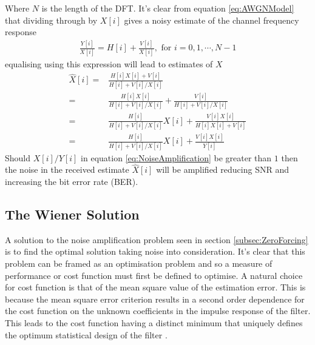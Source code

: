 Where $N$ is the length of the DFT. It's clear from %
equation \ref{eq:AWGNModel} that dividing through %
by $X[i]$ gives a noisy estimate of the channel %
frequency response
\begin{align}
	\frac{Y[i]}{X[i]} = H[i] + \frac{V[i]}{X[i]}, %
	\text{ for } i = 0,1,\cdots,N-1
\end{align}
equalising using this expression will lead to estimates %
of $X$
\begin{align}
	\hat{X}[i] =& \frac{H[i]X[i]+V[i]}{H[i]+V[i]/X[i]} \\
	=& \frac{H[i]X[i]}{H[i]+V[i]/X[i]} + \frac{V[i]}{H[i]
	+ V[i]/X[i]} \\
	=& \frac{H[i]}{H[i]+V[i]/X[i]}X[i] + 
	\frac{V[i]X[i]}{H[i]X[i]+V[i]}\\
	=& \frac{H[i]}{H[i]+V[i]/X[i]}X[i] + 
	\frac{V[i]X[i]}{Y[i]}
	\label{eq:NoiseAmplification}
\end{align}
Should $X[i]/Y[i]$ in equation \ref{eq:NoiseAmplification} %
be greater than $1$ then the noise in the received estimate %
$\hat{X}[i]$ will be amplified reducing SNR and increasing the bit %
error rate (BER).

\subsection{The Wiener Solution}
A solution to the noise amplification problem seen in %
section \ref{subsec:ZeroForcing} is to find the optimal %
solution taking noise into consideration. It's clear that %
this problem can be framed as an optimisation problem %
and so a measure of performance or cost function must %
first be defined to optimise. A natural choice for cost function %
is that of the mean square value of the estimation error. This %
is because the mean square error criterion results in a %
second order dependence for the cost function on the %
unknown coefficients in the impulse response of %
the filter. This leads to the cost function having a distinct %
minimum that uniquely defines the optimum %
statistical design of the filter \cite{Hay02}.
